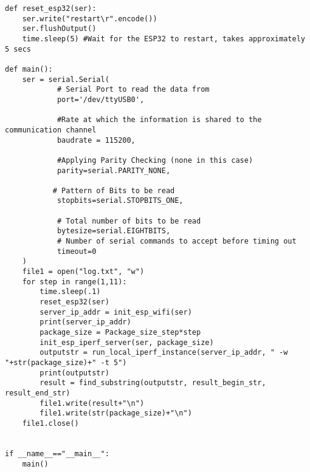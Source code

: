 \documentclass[../DCM2_Verslag.tex]{subfiles}
\begin{document}
\begin{lstlisting}
def reset_esp32(ser):
    ser.write("restart\r".encode())
    ser.flushOutput()
    time.sleep(5) #Wait for the ESP32 to restart, takes approximately 5 secs
       
def main():
    ser = serial.Serial(
            # Serial Port to read the data from
            port='/dev/ttyUSB0',
 
            #Rate at which the information is shared to the communication channel
            baudrate = 115200,
   
            #Applying Parity Checking (none in this case)
            parity=serial.PARITY_NONE,
 
           # Pattern of Bits to be read
            stopbits=serial.STOPBITS_ONE,
        
            # Total number of bits to be read
            bytesize=serial.EIGHTBITS,
            # Number of serial commands to accept before timing out
            timeout=0
    )
    file1 = open("log.txt", "w")
    for step in range(1,11):
        time.sleep(.1)
        reset_esp32(ser)
        server_ip_addr = init_esp_wifi(ser)
        print(server_ip_addr)
        package_size = Package_size_step*step
        init_esp_iperf_server(ser, package_size)
        outputstr = run_local_iperf_instance(server_ip_addr, " -w "+str(package_size)+" -t 5")
        print(outputstr)
        result = find_substring(outputstr, result_begin_str, result_end_str)
        file1.write(result+"\n")
        file1.write(str(package_size)+"\n")
    file1.close()

        
if __name__=="__main__":
    main()      

\end{lstlisting}
\end{document}
